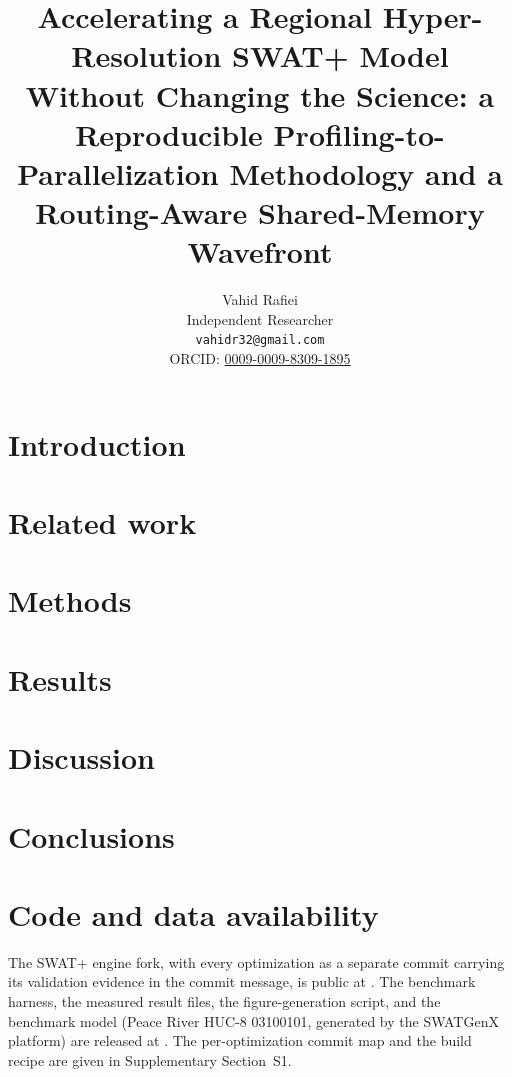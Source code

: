 \documentclass[12pt]{article}
\title{Accelerating a Regional Hyper-Resolution {SWAT+} Model Without Changing the Science:
a Reproducible Profiling-to-Parallelization Methodology and a Routing-Aware
Shared-Memory Wavefront}
\author{%
  Vahid Rafiei\\
  Independent Researcher\\
  \texttt{vahidr32@gmail.com}\\
  ORCID: \href{https://orcid.org/0009-0009-8309-1895}{0009-0009-8309-1895}
}
\date{}
\begin{document}
\maketitle



\section{Introduction}\label{sec:intro}


\section{Related work}\label{sec:related}


\section{Methods}\label{sec:methods}


\section{Results}\label{sec:results}


\section{Discussion}\label{sec:discussion}


\section{Conclusions}\label{sec:conclusions}


\section*{Code and data availability}
The SWAT+ engine fork, with every optimization as a separate commit carrying its validation
evidence in the commit message, is public at . The
benchmark harness, the measured result files, the figure-generation script, and the benchmark model
(Peace River HUC-8 03100101, generated by the SWATGenX platform) are released at
. The per-optimization commit map
and the build recipe are given in Supplementary Section~S1.
\end{document}
